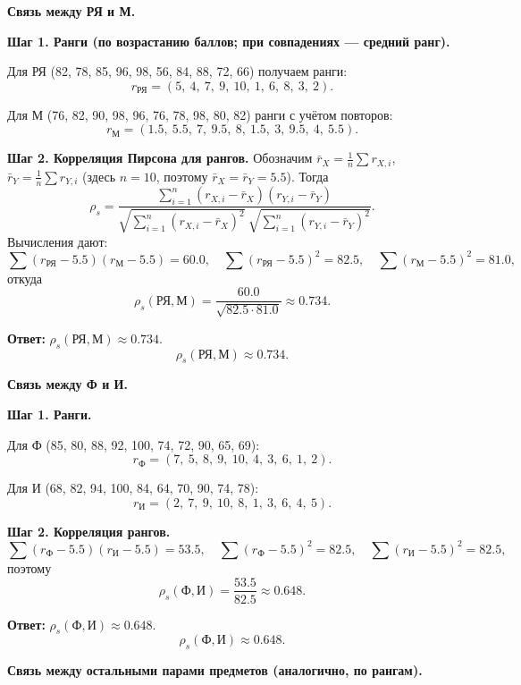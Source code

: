 \documentclass[12pt,a4paper]{article}
\begin{document}
\begin{enumerate}[label=\textbf{\arabic*.}]
\textbf{Связь между РЯ и М.}

\textbf{Шаг 1. Ранги (по возрастанию баллов; при совпадениях — средний ранг).}

Для РЯ (82, 78, 85, 96, 98, 56, 84, 88, 72, 66) получаем ранги:
\[
r_{\text{РЯ}}=(5,\ 4,\ 7,\ 9,\ 10,\ 1,\ 6,\ 8,\ 3,\ 2).
\]

Для М (76, 82, 90, 98, 96, 76, 78, 98, 80, 82) ранги с учётом повторов:
\[
r_{\text{М}}=(1.5,\ 5.5,\ 7,\ 9.5,\ 8,\ 1.5,\ 3,\ 9.5,\ 4,\ 5.5).
\]

\textbf{Шаг 2. Корреляция Пирсона для рангов.}
Обозначим $\bar r_X=\frac1n\sum r_{X,i}$, $\bar r_Y=\frac1n\sum r_{Y,i}$ (здесь $n=10$, поэтому $\bar r_X=\bar r_Y=5.5$).
Тогда
\[
\rho_s=\frac{\sum_{i=1}^n (r_{X,i}-\bar r_X)(r_{Y,i}-\bar r_Y)}
{\sqrt{\sum_{i=1}^n (r_{X,i}-\bar r_X)^2}\ \sqrt{\sum_{i=1}^n (r_{Y,i}-\bar r_Y)^2}}.
\]
Вычисления дают:
\[
\sum (r_{\text{РЯ}}-5.5)(r_{\text{М}}-5.5)=60.0,\quad
\sum (r_{\text{РЯ}}-5.5)^2=82.5,\quad
\sum (r_{\text{М}}-5.5)^2=81.0,
\]
откуда
\[
\rho_s(\text{РЯ},\text{М})=\frac{60.0}{\sqrt{82.5\cdot 81.0}}\approx 0.734.
\]

\textbf{Ответ:} $\rho_s(\text{РЯ},\text{М})\approx 0.734$.
\[
\rho_s(\text{РЯ},\text{М})\approx 0.734.
\]

\textbf{Связь между Ф и И.}

\textbf{Шаг 1. Ранги.}

Для Ф (85, 80, 88, 92, 100, 74, 72, 90, 65, 69):
\[
r_{\text{Ф}}=(7,\ 5,\ 8,\ 9,\ 10,\ 4,\ 3,\ 6,\ 1,\ 2).
\]

Для И (68, 82, 94, 100, 84, 64, 70, 90, 74, 78):
\[
r_{\text{И}}=(2,\ 7,\ 9,\ 10,\ 8,\ 1,\ 3,\ 6,\ 4,\ 5).
\]

\textbf{Шаг 2. Корреляция рангов.}
\[
\sum (r_{\text{Ф}}-5.5)(r_{\text{И}}-5.5)=53.5,\quad
\sum (r_{\text{Ф}}-5.5)^2=82.5,\quad
\sum (r_{\text{И}}-5.5)^2=82.5,
\]
поэтому
\[
\rho_s(\text{Ф},\text{И})=\frac{53.5}{82.5}\approx 0.648.
\]

\textbf{Ответ:} $\rho_s(\text{Ф},\text{И})\approx 0.648$.
\[
\rho_s(\text{Ф},\text{И})\approx 0.648.
\]

\textbf{Связь между остальными парами предметов (аналогично, по рангам).}


\end{enumerate}
\end{document}
